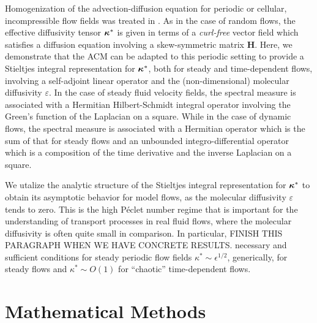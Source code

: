 \documentclass[11pt]{amsart}
\newcommand{\Hb}{\mathbf{H}}
\newcommand\bkappa{\mbox{\boldmath${\kappa}$}}
\begin{document}
Homogenization of the advection-diffusion equation for periodic or
cellular, incompressible flow fields was treated in
\cite{Fannjiang:SIAM_JAM:333,Fannjiang:1997:1033}. As in the case of
random flows, the effective diffusivity tensor
$\bkappa^*$ is given in terms of a \emph{curl-free} vector field which
satisfies a diffusion equation involving a skew-symmetric
matrix $\Hb$. Here, we demonstrate that the ACM can
be adapted to this periodic setting to provide a Stieltjes
integral representation for $\bkappa^*$, both for steady and
time-dependent flows, involving a self-adjoint linear operator and the 
(non-dimensional) molecular diffusivity $\varepsilon$. In the case of steady
fluid velocity fields, the spectral measure is associated with a
Hermitian Hilbert-Schmidt integral operator involving the Green's
function of the Laplacian on a square. While in the case of dynamic
flows, the spectral measure is associated with a Hermitian operator
which is the sum of that for steady flows and an unbounded
integro-differential operator which is a composition of the time
derivative and the inverse Laplacian on a square.     
 

We utalize the analytic structure of the Stieltjes integral
representation for $\bkappa^*$ to obtain its asymptotic behavior for
model flows, as the molecular diffusivity $\varepsilon$ tends to zero. This is
the high P\'{e}clet number regime that is important for the
understanding of transport processes in real fluid flows, where the
molecular diffusivity is often quite small in comparison. In
particular, FINISH THIS PARAGRAPH WHEN WE HAVE CONCRETE RESULTS.
necessary and sufficient conditions for steady periodic flow
fields $\kappa^*\sim\epsilon^{1/2}$, generically, for steady flows and $\kappa^*\sim O(1)$ for
``chaotic'' time-dependent flows. 

%
\section{Mathematical Methods}\label{sec:Mathematical_Methods} 
%
\end{document}
